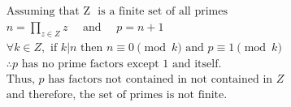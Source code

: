 $$
\begin{aligned}
&\text{Assuming that Z }\text{ is a finite set of all primes} \\
&n = \prod_{z \in Z}^{} z \quad \text{ and } \quad p = n+1 \\
&\forall k \in Z, \text{ if } k | n \text{ then } n \equiv 0 \pmod{k} \text{ and } p \equiv 1 \pmod{k} \\
&\therefore p \text{ has no prime factors except 1 and itself.} \\
&\text{Thus, } p \text{ has factors not contained in not contained in } Z \\
&\text{and therefore, the set of primes is not finite.}
\end{aligned}
$$
